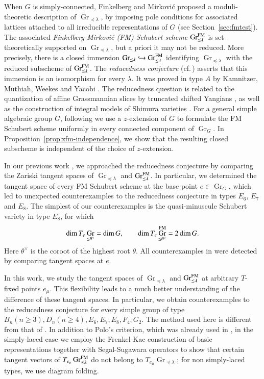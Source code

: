 \documentclass[a4paper, 12pt]{amsart}
\theoremstyle{definition}
\DeclareMathOperator{\Gr}{\mathrm{Gr}}
\begin{document}
When $G$ is simply-connected, Finkelberg and Mirkovi\'c \cite{FM} proposed a moduli-theoretic
description of $\Gr_{\preceq\lambda}$, by imposing pole conditions for  associated lattices attached to all irreducible
representations of $G$ (see Section~\ref{sec:fmtest}).  The associated 
\emph{Finkelberg-Mirkovi\'c (FM) Schubert scheme}
$\Gr^{\rm FM}_{\preceq\lambda}$ is set-theoretically supported on
$\Gr_{\preceq\lambda}$, but a priori it may not be reduced.  More precisely, there is a
closed immersion  $\Gr_{\preceq\lambda}\hookrightarrow\Gr^{\rm FM}_{\preceq\lambda}$ 
identifying $\Gr_{\preceq\lambda}$ with the reduced subscheme of
$\Gr^{\rm FM}_{\preceq\lambda}$.  The \emph{reducedness conjecture}
(cf.\,\cite{KMW,KWWY}) asserts that this immersion is an
isomorphism for every $\lambda$.  It was proved in type $A$ by
Kamnitzer, Muthiah, Weekes and Yacobi \cite{KMWY}.  The reducedness question is related to
the quantization of affine Grassmannian slices by truncated shifted Yangians
\cite{KWWY}, as well as the construction of integral models of Shimura varieties \cite{KPZ}.
For a general simple algebraic group $G$, following \cite{ZhuPCMI,KPZ} we use a
$z$-extension of $G$ to formulate the FM Schubert scheme uniformly in every
connected component of $\Gr_G$. In Proposition~\ref{prop:zfm-independence}, we show that
the resulting closed subscheme is independent of the choice of $z$-extension.

In our previous work \cite{BHY}, we approached the reducedness conjecture by
comparing the Zariski tangent spaces of $\Gr_{\preceq\lambda}$ and
$\Gr^{\rm FM}_{\preceq\lambda}$.  In particular, we determined the
tangent space of every FM Schubert scheme at the base point
$e\in\Gr_G$, which led to unexpected counterexamples to the reducedness conjecture
in types $E_6$, $E_7$ and $E_8$.  The simplest of our counterexamples is the
quasi-minuscule Schubert variety in type $E_8$, for which
\[
 \dim T_e\Gr_{\preceq\theta^\vee}=\dim G,
 \qquad
 \dim T_e\Gr^{\rm FM}_{\preceq\theta^\vee}=2\dim G.
\]
Here $\theta^\vee$ is the coroot of the highest root $\theta$.
All counterexamples in \cite{BHY} were detected by comparing tangent spaces at $e$. 
\vspace{2mm}


In this work, we study the tangent spaces of $\Gr_{\preceq \lambda}$ and $\Gr_{\preceq \lambda}^{\rm FM}$ at arbitrary $T$-fixed points
$e_\mu$.  This flexibility leads to a much better understanding of the difference of these tangent spaces. In particular, we obtain counterexamples to the reducedness conjecture for every simple group of type $B_n (n\geq3), D_n (n\geq 4), E_6, E_7, E_8, F_4, G_2$.  The method used here is different from that of \cite{BHY}. In addition to Polo's criterion, which was already used  in \cite{BHY}, in the simply-laced case we employ the Frenkel-Kac construction of basic representations together with Segal-Sugawara operators to show that certain tangent vectors of $T_{e_\mu}\Gr^{\rm FM}_{\preceq \lambda}$ do not belong to $T_{e_\mu}\Gr_{\preceq \lambda}$; for non simply-laced types, we use diagram folding. 
\end{document}
